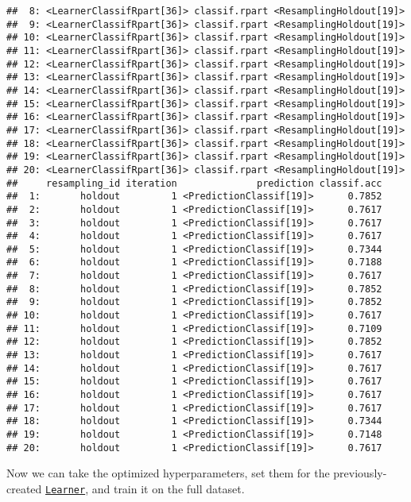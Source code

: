 \documentclass[
]{scrbook}
\begin{document}
\begin{verbatim}
##  8: <LearnerClassifRpart[36]> classif.rpart <ResamplingHoldout[19]>
##  9: <LearnerClassifRpart[36]> classif.rpart <ResamplingHoldout[19]>
## 10: <LearnerClassifRpart[36]> classif.rpart <ResamplingHoldout[19]>
## 11: <LearnerClassifRpart[36]> classif.rpart <ResamplingHoldout[19]>
## 12: <LearnerClassifRpart[36]> classif.rpart <ResamplingHoldout[19]>
## 13: <LearnerClassifRpart[36]> classif.rpart <ResamplingHoldout[19]>
## 14: <LearnerClassifRpart[36]> classif.rpart <ResamplingHoldout[19]>
## 15: <LearnerClassifRpart[36]> classif.rpart <ResamplingHoldout[19]>
## 16: <LearnerClassifRpart[36]> classif.rpart <ResamplingHoldout[19]>
## 17: <LearnerClassifRpart[36]> classif.rpart <ResamplingHoldout[19]>
## 18: <LearnerClassifRpart[36]> classif.rpart <ResamplingHoldout[19]>
## 19: <LearnerClassifRpart[36]> classif.rpart <ResamplingHoldout[19]>
## 20: <LearnerClassifRpart[36]> classif.rpart <ResamplingHoldout[19]>
##     resampling_id iteration              prediction classif.acc
##  1:       holdout         1 <PredictionClassif[19]>      0.7852
##  2:       holdout         1 <PredictionClassif[19]>      0.7617
##  3:       holdout         1 <PredictionClassif[19]>      0.7617
##  4:       holdout         1 <PredictionClassif[19]>      0.7617
##  5:       holdout         1 <PredictionClassif[19]>      0.7344
##  6:       holdout         1 <PredictionClassif[19]>      0.7188
##  7:       holdout         1 <PredictionClassif[19]>      0.7617
##  8:       holdout         1 <PredictionClassif[19]>      0.7852
##  9:       holdout         1 <PredictionClassif[19]>      0.7852
## 10:       holdout         1 <PredictionClassif[19]>      0.7617
## 11:       holdout         1 <PredictionClassif[19]>      0.7109
## 12:       holdout         1 <PredictionClassif[19]>      0.7852
## 13:       holdout         1 <PredictionClassif[19]>      0.7617
## 14:       holdout         1 <PredictionClassif[19]>      0.7617
## 15:       holdout         1 <PredictionClassif[19]>      0.7617
## 16:       holdout         1 <PredictionClassif[19]>      0.7617
## 17:       holdout         1 <PredictionClassif[19]>      0.7617
## 18:       holdout         1 <PredictionClassif[19]>      0.7344
## 19:       holdout         1 <PredictionClassif[19]>      0.7148
## 20:       holdout         1 <PredictionClassif[19]>      0.7617
\end{verbatim}

Now we can take the optimized hyperparameters, set them for the previously-created \href{https://mlr3.mlr-org.com/reference/Learner.html}{\texttt{Learner}}, and train it on the full dataset.
\end{document}
